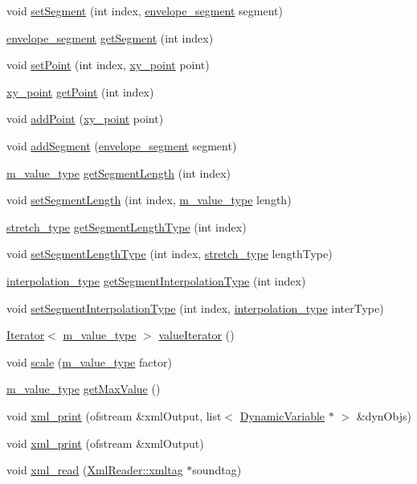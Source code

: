 \begin{CompactItemize}
\item 
void \hyperlink{classEnvelope_a14}{set\-Segment} (int index, \hyperlink{structenvelope__segment}{envelope\_\-segment} segment)
\item 
\hyperlink{structenvelope__segment}{envelope\_\-segment} \hyperlink{classEnvelope_a15}{get\-Segment} (int index)
\item 
void \hyperlink{classEnvelope_a16}{set\-Point} (int index, \hyperlink{structxy__point}{xy\_\-point} point)
\item 
\hyperlink{structxy__point}{xy\_\-point} \hyperlink{classEnvelope_a17}{get\-Point} (int index)
\item 
void \hyperlink{classEnvelope_a18}{add\-Point} (\hyperlink{structxy__point}{xy\_\-point} point)
\item 
void \hyperlink{classEnvelope_a19}{add\-Segment} (\hyperlink{structenvelope__segment}{envelope\_\-segment} segment)
\item 
\hyperlink{Types_8h_a3}{m\_\-value\_\-type} \hyperlink{classEnvelope_a20}{get\-Segment\-Length} (int index)
\item 
void \hyperlink{classEnvelope_a21}{set\-Segment\-Length} (int index, \hyperlink{Types_8h_a3}{m\_\-value\_\-type} length)
\item 
\hyperlink{Types_8h_a12}{stretch\_\-type} \hyperlink{classEnvelope_a22}{get\-Segment\-Length\-Type} (int index)
\item 
void \hyperlink{classEnvelope_a23}{set\-Segment\-Length\-Type} (int index, \hyperlink{Types_8h_a12}{stretch\_\-type} length\-Type)
\item 
\hyperlink{Types_8h_a13}{interpolation\_\-type} \hyperlink{classEnvelope_a24}{get\-Segment\-Interpolation\-Type} (int index)
\item 
void \hyperlink{classEnvelope_a25}{set\-Segment\-Interpolation\-Type} (int index, \hyperlink{Types_8h_a13}{interpolation\_\-type} inter\-Type)
\item 
\hyperlink{classIterator}{Iterator}$<$ \hyperlink{Types_8h_a3}{m\_\-value\_\-type} $>$ \hyperlink{classEnvelope_a26}{value\-Iterator} ()
\item 
void \hyperlink{classEnvelope_a27}{scale} (\hyperlink{Types_8h_a3}{m\_\-value\_\-type} factor)
\item 
\hyperlink{Types_8h_a3}{m\_\-value\_\-type} \hyperlink{classEnvelope_a28}{get\-Max\-Value} ()
\item 
void \hyperlink{classEnvelope_a29}{xml\_\-print} (ofstream \&xml\-Output, list$<$ \hyperlink{classDynamicVariable}{Dynamic\-Variable} $\ast$ $>$ \&dyn\-Objs)
\item 
void \hyperlink{classEnvelope_a30}{xml\_\-print} (ofstream \&xml\-Output)
\item 
void \hyperlink{classEnvelope_a31}{xml\_\-read} (\hyperlink{classXmlReader_1_1xmltag}{Xml\-Reader::xmltag} $\ast$soundtag)
\end{CompactItemize}
